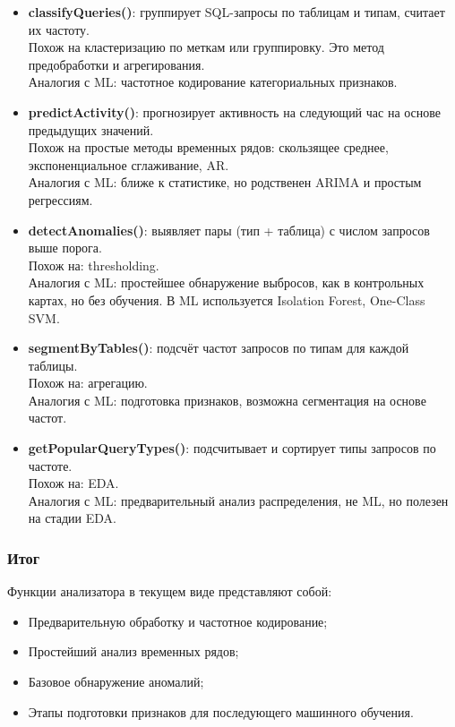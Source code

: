 \documentclass[14pt]{extarticle}
\begin{document}
\begin{itemize}
    \item \textbf{classifyQueries()}: группирует SQL-запросы по таблицам и типам, считает их частоту.\\
    Похож на кластеризацию по меткам или группировку. Это метод предобработки и агрегирования.\\
    Аналогия с ML: частотное кодирование категориальных признаков.
    
    \item \textbf{predictActivity()}: прогнозирует активность на следующий час на основе предыдущих значений.\\
    Похож на простые методы временных рядов: скользящее среднее, экспоненциальное сглаживание, AR.\\
    Аналогия с ML: ближе к статистике, но родственен ARIMA и простым регрессиям.

    \item \textbf{detectAnomalies()}: выявляет пары (тип + таблица) с числом запросов выше порога.\\
    Похож на: thresholding.\\
    Аналогия с ML: простейшее обнаружение выбросов, как в контрольных картах, но без обучения. В ML используется Isolation Forest, One-Class SVM.

    \item \textbf{segmentByTables()}: подсчёт частот запросов по типам для каждой таблицы.\\
    Похож на: агрегацию.\\
    Аналогия с ML: подготовка признаков, возможна сегментация на основе частот.

    \item \textbf{getPopularQueryTypes()}: подсчитывает и сортирует типы запросов по частоте.\\
    Похож на: EDA.\\
    Аналогия с ML: предварительный анализ распределения, не ML, но полезен на стадии EDA.
\end{itemize}

\subsubsection{Итог}

Функции анализатора в текущем виде представляют собой:
\begin{itemize}
    \item Предварительную обработку и частотное кодирование;
    \item Простейший анализ временных рядов;
    \item Базовое обнаружение аномалий;
    \item Этапы подготовки признаков для последующего машинного обучения.
\end{itemize}
\end{document}
